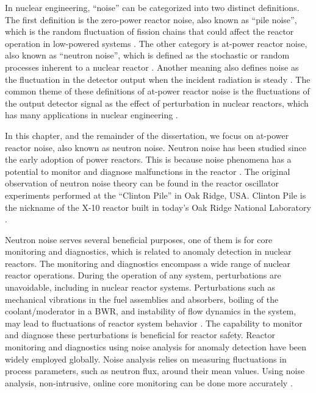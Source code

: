 \label{ch:literature_review}

In nuclear engineering, “noise” can be categorized into two distinct definitions. The first definition is the zero-power reactor noise, also known as “pile noise”, which is the random fluctuation of fission chains that could affect the reactor operation in low-powered systems \cite{pazsitNoiseTechniquesNuclear2010, pazsitNeutronFluctuationsTreatise2008, uhrigRandomNoiseTechniques1970}. The other category is at-power reactor noise, also known as “neutron noise”, which is defined as the stochastic or random processes inherent to a nuclear reactor \cite{saitoTheoryPowerReactor1974b}. Another meaning also defines noise as the fluctuation in the detector output when the incident radiation is steady \cite{pacilioAnalysisReactorNoise1979}. The common theme of these definitions of at-power reactor noise is the fluctuations of the output detector signal as the effect of perturbation in nuclear reactors, which has many applications in nuclear engineering \cite{thiePowerReactorNoise1981}.

In this chapter, and the remainder of the dissertation, we focus on at-power reactor noise, also known as neutron noise. Neutron noise has been studied since the early adoption of power reactors. This is because noise phenomena has a potential to monitor and diagnose malfunctions in the reactor \cite{ferrierReactorNoise1963, saitoTheoryPowerReactor1974, saitoTheoryPowerReactor1974a}. The original observation of neutron noise theory can be found in the reactor oscillator experiments performed at the “Clinton Pile” in Oak Ridge, USA. Clinton Pile is the nickname of the X-10 reactor built in today’s Oak Ridge National Laboratory \cite{pazsitNoiseTechniquesNuclear2010}. 

Neutron noise serves several beneficial purposes, one of them is for core monitoring and diagnostics, which is related to anomaly detection in nuclear reactors. The monitoring and diagnostics encompass a wide range of nuclear reactor operations. During the operation of any system, perturbations are unavoidable, including in nuclear reactor systems. Perturbations such as mechanical vibrations in the fuel assemblies and absorbers, boiling of the coolant/moderator in a BWR, and instability of flow dynamics in the system, may lead to fluctuations of reactor system behavior \cite{thiePowerReactorNoise1981}. The capability to monitor and diagnose these perturbations is beneficial for reactor safety. Reactor monitoring and diagnostics using noise analysis for anomaly detection have been widely employed globally. Noise analysis relies on measuring fluctuations in process parameters, such as neutron flux, around their mean values. Using noise analysis, non-intrusive, online core monitoring can be done more accurately \cite{demaziereDevelopmentNonintrusiveMethod2002}.

